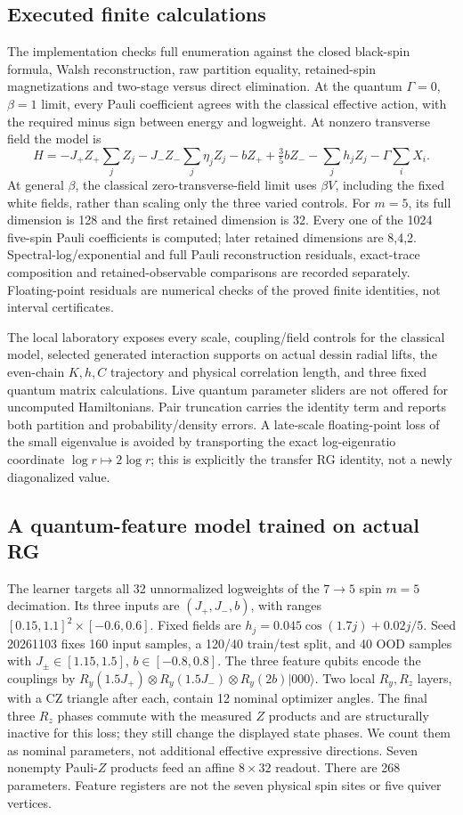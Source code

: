 \documentclass[11pt,oneside,openany]{book}
\theoremstyle{definition}\newtheorem{definition}[theorem]{Definition}
\theoremstyle{remark}\newtheorem{remark}[theorem]{Remark}
\begin{document}
\subsection{Executed finite calculations}
The implementation checks full enumeration against the closed black-spin
formula, Walsh reconstruction, raw partition equality, retained-spin
magnetizations and two-stage versus direct elimination. At the quantum
$\Gamma=0$, $\beta=1$ limit, every Pauli coefficient agrees with the
classical effective action, with the required minus sign between energy
and logweight. At nonzero transverse field the model is
\[
 H=-J_+Z_+\sum_jZ_j-J_-Z_-\sum_j\eta_jZ_j-bZ_+
       +\tfrac 35 bZ_--\sum_jh_jZ_j-\Gamma\sum_iX_i.
\]
At general $\beta $, the classical zero-transverse-field limit uses $\beta V $, including the fixed white fields, rather than scaling only the three varied controls.
For $ m=5$, its full dimension is 128 and the first retained dimension is 32.
Every one of the 1024 five-spin Pauli coefficients is computed; later
retained dimensions are 8,4,2. Spectral-log/exponential and full Pauli
reconstruction residuals, exact-trace composition and retained-observable
comparisons are recorded separately. Floating-point residuals are numerical
checks of the proved finite identities, not interval certificates.

The local laboratory exposes every scale, coupling/field controls for the
classical model, selected generated interaction supports on actual dessin
radial lifts, the even-chain $ K,h,C $ trajectory and physical correlation
length, and three fixed quantum matrix calculations. Live quantum parameter
sliders are not offered for uncomputed Hamiltonians. Pair truncation carries
the identity term and reports both partition and probability/density errors.
A late-scale floating-point loss of the small eigenvalue is avoided by
transporting the exact log-eigenratio coordinate $\log r\mapsto 2\log r $;
this is explicitly the transfer RG identity, not a newly diagonalized value.

\subsection{A quantum-feature model trained on actual RG}
The learner targets all 32 unnormalized logweights of the $7\to 5$ spin
$ m=5$ decimation. Its three inputs are $(J_+,J_-,b)$, with ranges
$[0.15,1.1]^2\times[-0.6,0.6]$. Fixed fields are
$ h_j=0.045\cos(1.7 j)+0.02 j/5$. Seed 20261103 fixes 160 input samples, a
120/40 train/test split, and 40 OOD samples with $ J_\pm\in[1.15,1.5]$,
$ b\in[-0.8,0.8]$. The three feature qubits encode the couplings by
$ R_y(1.5 J_+)\otimes R_y(1.5 J_-)\otimes R_y(2 b)|000\rangle $.
Two local $ R_y,R_z $ layers, with a CZ triangle after each, contain 12
nominal optimizer angles. The final three $ R_z $ phases commute with the
measured $ Z $ products and are structurally inactive for this loss; they
still change the displayed state phases. We count them as nominal
parameters, not additional effective expressive directions. Seven nonempty Pauli-$ Z $ products feed an affine
$8\times 32$ readout. There are 268 parameters. Feature registers are not
the seven physical spin sites or five quiver vertices.
\end{document}
